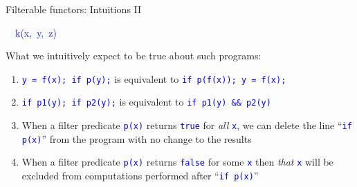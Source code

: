 \documentclass[english]{beamer}
\newenvironment{lyxcode}
   {\par\begin{list}{}{
     \setlength{\rightmargin}{\leftmargin}
     \setlength{\listparindent}{0pt}%
     \raggedright
     \setlength{\itemsep}{0pt}
     \setlength{\parsep}{0pt}
     \normalfont\ttfamily}%
    \def\{{\char`\{}
    \def\}{\char`\}}
    \def\textasciitilde{\char`\~}
    \item[]}
   {\end{list}}
\begin{document}
\begin{frame}{Filterable functors: Intuitions II}
\begin{itemize}
\begin{lyxcode}
\textcolor{blue}{\footnotesize{}~~k(x,~y,~z)}{\footnotesize \par}
\end{lyxcode}
\item What we intuitively expect to be true about such programs:
\begin{enumerate}
\item \texttt{\textcolor{blue}{\footnotesize{}y = f(x); if p(y);}} is equivalent
to \texttt{\textcolor{blue}{\footnotesize{}if p(f(x)); y = f(x);}} 
\item \texttt{\textcolor{blue}{\footnotesize{}if p1(y); if p2(y);}} is equivalent
to \texttt{\textcolor{blue}{\footnotesize{}if p1(y) \&\& p2(y)}} 
\item When a filter predicate \texttt{\textcolor{blue}{\footnotesize{}p(x)}}
returns \texttt{\textcolor{blue}{\footnotesize{}true}} for \emph{all}
\texttt{\textcolor{blue}{\footnotesize{}x}}, we can delete the line
``\texttt{\textcolor{blue}{\footnotesize{}if p(x)}}'' from the program
with no change to the results
\item When a filter predicate \texttt{\textcolor{blue}{\footnotesize{}p(x)}}
returns \texttt{\textcolor{blue}{\footnotesize{}false}} for some \texttt{\textcolor{blue}{\footnotesize{}x}}
then\emph{ that} \texttt{\textcolor{blue}{\footnotesize{}x}} will
be excluded from computations performed after ``\texttt{\textcolor{blue}{\footnotesize{}if
p(x)}}''
\end{enumerate}
\end{itemize}
\end{frame}
\end{document}
